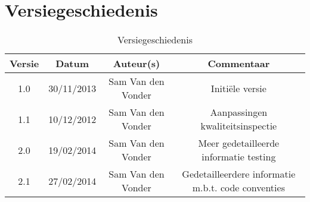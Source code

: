 \chapter{Versiegeschiedenis}

\begin{table}[htbp]
	\centering
	\caption{Versiegeschiedenis}
	\begin{tabular} {|c|c|c|c|}
	    \hline
		\textbf{Versie} & \textbf{Datum} 	& \textbf{Auteur(s)} & \textbf{Commentaar} \\
		\hline
		1.0	& 30/11/2013	& Sam Van den Vonder & Initi\"{e}le versie \\ \hline
		1.1 & 10/12/2012	& Sam Van den Vonder & Aanpassingen kwaliteitsinspectie \\ \hline
		2.0 & 19/02/2014	& Sam Van den Vonder & Meer gedetailleerde informatie testing \\ \hline
		2.1 & 27/02/2014	& Sam Van den Vonder & Gedetailleerdere informatie m.b.t. code conventies \\ \hline
	\end{tabular}
\end{table}